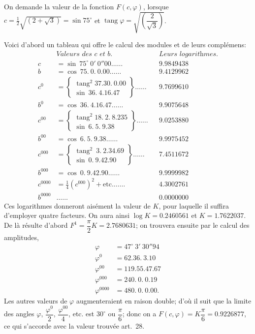 \documentclass{article}
\begin{document}
On demande la valeur de la fonction $F(c,\varphi)$, lorsque $c=\frac{1}{2}\sqrt{(2+\sqrt{3})}=\sin75^{\circ}$ et $\operatorname{tang}\varphi=\sqrt{\left(\dfrac{2}{\sqrt{3}}\right)}$.


Voici d'abord un tableau qui offre le calcul des modules et de leurs complémens:
\[ \begin{aligned} &\textit{Valeurs des c et b.} && \textit{Leurs logarithmes.}\\ c&=\sin\ 75^{\circ}\ 0'\ 0''00\ldots\ldots && 9.9849438\\ b&=\cos\ 75.\ 0.\ 0.00\ldots\ldots && 9.4129962\\ c^{0}&=\left\{\begin{array}{l}\operatorname{tang}^{2}37.30.\ 0.00\\ \sin\ 36.\ 4.16.47\end{array}\right\}\ldots\ldots && 9.7699610\\ b^{0}&=\cos\ 36.\ 4.16.47\ldots\ldots && 9.9075648\\ c^{00}&=\left\{\begin{array}{l}\operatorname{tang}^{2}18.\ 2.\ 8.235\\ \sin\ 6.\ 5.\ 9.38\end{array}\right\}\ldots\ldots && 9.0253880\\ b^{00}&=\cos\ 6.\ 5.\ 9.38\ldots\ldots && 9.9975452\\ c^{000}&=\left\{\begin{array}{l}\operatorname{tang}^{2}\ 3.\ 2.34.69\\ \sin\ 0.\ 9.42.90\end{array}\right\}\ldots\ldots && 7.4511672\\ b^{000}&=\cos\ 0.\ 9.42.90\ldots\ldots && 9.9999982\\ c^{0000}&=\tfrac{1}{4}(c^{000})^{2}+\text{etc.}\ldots\ldots && 4.3002761\\ b^{0000}&\ldots\ldots && 0.0000000 \end{aligned} \]
Ces logarithmes donneront aisément la valeur de $K$, pour laquelle il suffira d'employer quatre facteurs. On aura ainsi $\log K=0.2460561$ et $K=1.7622037$. De là résulte d'abord $F^{1}=\dfrac{\pi}{2}K=2.7680631$; on trouvera ensuite par le calcul des amplitudes,
\[ \begin{aligned} \varphi&=47^{\circ}\ 3'\ 30''94\\ \varphi^{0}&=62.36.\ 3.10\\ \varphi^{00}&=119.55.47.67\\ \varphi^{000}&=240.\ 0.\ 0.19\\ \varphi^{0000}&=480.\ 0.\ 0.00. \end{aligned} \]
Les autres valeurs de $\varphi$ augmenteraient en raison double; d'où il suit que la limite des angles $\varphi$, $\dfrac{\varphi^{0}}{2}$, $\dfrac{\varphi^{00}}{4}$, etc. est $30^{\circ}$ ou $\dfrac{\pi}{6}$; donc on a $F(c,\varphi)=K\dfrac{\pi}{6}=0.9226877$, ce qui s'accorde avec la valeur trouvée art.~28.
\end{document}
